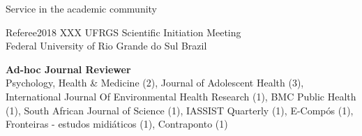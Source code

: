 \begin{rSection}{Service in the academic community}

\begin{rSubsection}
{Referee}{2018}
{XXX UFRGS Scientific Initiation Meeting}\\
{Federal University of Rio Grande do Sul} \hfill {Brazil}
\end{rSubsection}

\textbf{Ad-hoc Journal Reviewer}\\
{Psychology, Health \& Medicine} (2), {Journal of Adolescent Health} (3), {International Journal Of Environmental Health Research} (1), {BMC Public Health} (1), {South African Journal of Science} (1), {IASSIST Quarterly} (1), {E-Compós} (1), {Fronteiras - estudos midiáticos} (1), {Contraponto} (1)

\end{rSection}
\vspace{1em}